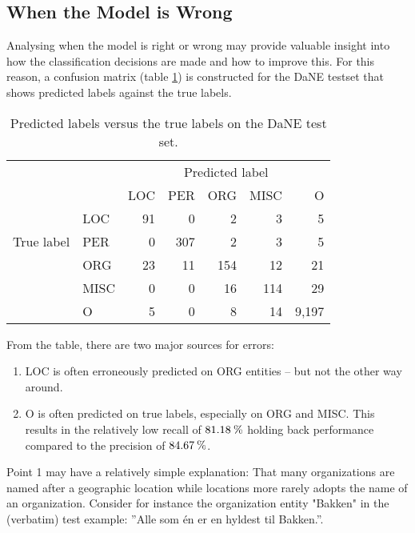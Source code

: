\documentclass[main.tex]{subfiles}
\begin{document}
\subsection{When the Model is Wrong}

Analysing when the model is right or wrong may provide valuable insight into how the classification decisions are made and how to improve this.
For this reason, a confusion matrix (table \ref{tab:pred-true-confmat}) is constructed for the DaNE testset that shows predicted labels against the true labels\footnotemark.


\begin{table}[H]
    \centering
    \small
    \begin{tabular}{l l | r r r r r }
        & &	\multicolumn{5}{c}{Predicted label}	\\
        \multirow{5}{*}{True label} & & LOC & PER & ORG & MISC & O \\\hline
            & LOC  & 91 & 0    & 2   & 3   & 5   \\
            & PER  & 0  & 307  & 2   & 3   & 5   \\
            & ORG  & 23 & 11   & 154 & 12  & 21  \\
            & MISC & 0  & 0    & 16  & 114 & 29  \\
            & O    & 5  & 0    & 8   & 14  & 9,197
    \end{tabular}
    \caption{Predicted labels versus the true labels on the DaNE test set.}
    \label{tab:pred-true-confmat}
\end{table}\noindent
From the table, there are two major sources for errors:
\begin{enumerate}
    \item LOC is often erroneously predicted on ORG entities -- but not the other way around.
    \item O is often predicted on true labels, especially on ORG and MISC. This results in the relatively low recall of $81.18\:\text{\%{}}$ holding back performance compared to the precision of $84.67\:\text{\%{}}$.
\end{enumerate}
Point 1 may have a relatively simple explanation: 
That many organizations are named after a geographic location while locations more rarely adopts the name of an organization.
Consider for instance the organization entity "Bakken" in the (verbatim) test example: ''Alle som én er en hyldest til Bakken.''.
\end{document}
